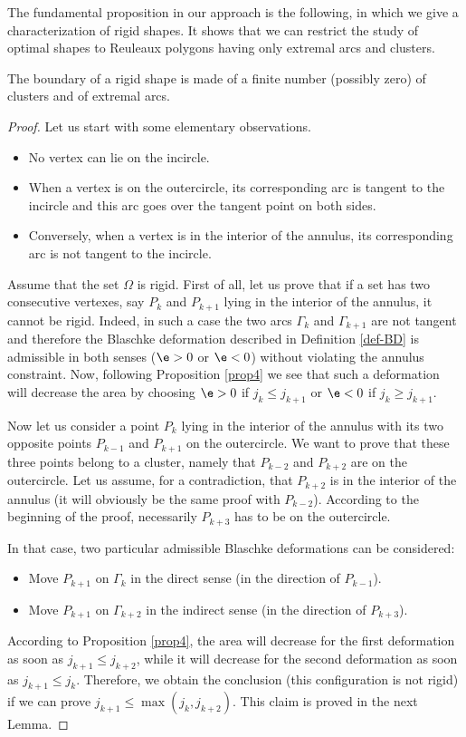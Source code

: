 The fundamental proposition in our approach is the following, {in which we give a characterization of rigid shapes}. It shows that we can restrict
the study of optimal shapes to Reuleaux polygons having only extremal arcs and clusters.
\begin{proposition}\label{propfund}
The boundary of a rigid shape is made of a finite number (possibly zero) of clusters and of extremal arcs.
\end{proposition}
\begin{proof}
Let us start with some elementary observations.
\begin{itemize}
\item No vertex can lie on the incircle.
\item When a vertex is on the outercircle, its corresponding arc is tangent to the incircle
and this arc goes over the tangent point on both sides.
\item Conversely, when a vertex is in the interior of the annulus, its corresponding arc is not
tangent to the incircle.
\end{itemize}

Assume that the set $\Omega$ is rigid.
First of all, let us prove that if a set has two consecutive vertexes, say $P_k$ and $P_{k+1}$
lying in the interior of the annulus, it cannot be rigid. Indeed, in such a case the two arcs
$\Gamma_k$ and $\Gamma_{k+1}$ are not tangent
and therefore the Blaschke deformation described in Definition
\ref{def-BD} is admissible in both senses ($\e>0$ or $\e<0$) without violating the annulus
constraint. Now, following Proposition \ref{prop4} we see that such a deformation will decrease the area by choosing $\e>0$ if $j_k\leq j_{k+1}$ or $\e<0$ if $j_k\geq j_{k+1}$.

Now let us consider a point $P_k$ lying in the interior of the annulus with its two
opposite points $P_{k-1}$ and $P_{k+1}$ on the outercircle. We want to prove
that these three points belong to a cluster, namely that $P_{k-2}$ and $P_{k+2}$ are
on the outercircle. Let us assume, for a contradiction, that $P_{k+2}$ is in the interior
of the annulus (it will obviously be the same proof with $P_{k-2}$). According to the beginning of the
proof, necessarily $P_{k+3}$ has to be on the outercircle.

In that case, two particular admissible Blaschke deformations can be considered:
\begin{itemize}
\item Move $P_{k+1}$ on $\Gamma_k$ in the direct sense (in the direction of $P_{k-1}$).
\item Move $P_{k+1}$ on $\Gamma_{k+2}$ in the indirect sense (in the direction of $P_{k+3}$).
\end{itemize}
According to Proposition \ref{prop4}, the area will decrease for the first deformation
as soon as $j_{k+1} \leq j_{k+2}$, while it will decrease for the second deformation
as soon as $j_{k+1} \leq j_{k}$. Therefore, we obtain the conclusion (this configuration
is not rigid) if we can prove $j_{k+1} \leq \max(j_{k},j_{k+2})$. This claim is proved in the next Lemma.
\end{proof}

